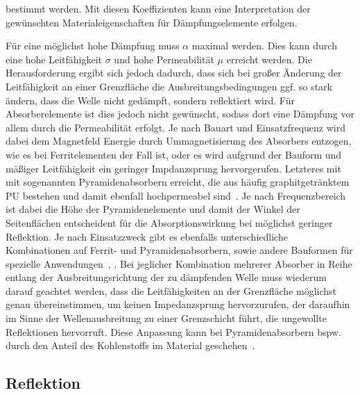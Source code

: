 bestimmt werden. Mit diesen Koeffizienten kann eine Interpretation der gewünschten Materialeigenschaften für Dämpfungselemente erfolgen. 
\par
\vspace{\linespace}
Für eine möglichst hohe Dämpfung muss $\alpha$ maximal werden. Dies kann durch eine hohe Leitfähigkeit $\sigma$ und hohe Permeabilität $\mu$ erreicht werden. Die Herausforderung ergibt sich jedoch dadurch, dass sich bei großer Änderung der Leitfähigkeit an einer Grenzfläche die Ausbreitungsbedingungen ggf. so stark ändern, dass die Welle nicht gedämpft, sondern reflektiert wird. Für Absorberelemente ist dies jedoch nicht gewünscht, sodass dort eine Dämpfung vor allem durch die Permeabilität erfolgt. Je nach Bauart und Einsatzfrequenz wird dabei dem Magnetfeld Energie durch Ummagnetisierung des Absorbers entzogen, wie es bei Ferritelementen der Fall ist, oder es wird aufgrund der Bauform und mäßiger Leitfähigkeit ein geringer Impdanzsprung hervorgerufen. Letzteres mit mit sogenannten Pyramidenabsorbern erreicht, die aus häufig graphitgetränktem \ac{PU} bestehen und damit ebenfall hochpermeabel sind~\cite{EM_Schirmung}. Je nach Frequenzbereich ist dabei die Höhe der Pyramidenelemente und damit der Winkel der Seitenflächen entscheident für die Absorptionswirkung bei möglichst geringer Reflektion. Je nach Einsatzzweck gibt es ebenfalls unterschiedliche Kombinationen auf Ferrit- und Pyramidenabsorbern, sowie andere Bauformen für spezielle Anwendungen~\cite{EMV-Support_Produktseite}, \cite{Telemeter_Produktseite}. Bei jeglicher Kombination mehrerer Absorber in Reihe entlang der Ausbreitungsrichtung der zu dämpfenden Welle muss wiederum darauf geachtet werden, dass die Leitfähigkeiten an der Grenzfläche möglichst genau übereinstimmen, um keinen Impedanzsprung hervorzurufen, der daraufhin im Sinne der Wellenausbreitung zu einer Grenzschicht führt, die ungewollte Reflektionen hervorruft. Diese Anpassung kann bei Pyramidenabsorbern bspw. durch den Anteil des Kohlenstoffs im Material geschehen~\cite{EM_Schirmung}.




\subsection{Reflektion}\label{cha:2_sub_Reflektion}


